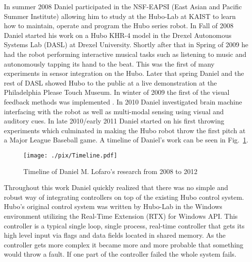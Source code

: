 In summer 2008 Daniel participated in the NSF-EAPSI (East Asian and Pacific Summer Institute) allowing him to study at the Hubo-Lab at KAIST to learn how to maintain, operate and program the Hubo series robot.
In Fall of 2008 Daniel started his work on a Hubo KHR-4 model in the Drexel Autonomous Systems Lab (DASL) at Drexel University.
Shortly after that in Spring of 2009 he had the robot performing interactive musical tasks such as listening to music and autonomously tapping its hand to the beat\cite{5686847}.
This was the first of many experiments in sensor integration on the Hubo.
Later that spring Daniel and the rest of DASL showed Hubo to the public at a live demonstration at the Philadelphia Please Touch Museum. 
In winter of 2009 the first of the visual feedback methods was implemented \cite{lofaroGamesRobot}.
In 2010 Daniel investigated brain machine interfacing with the robot as well as multi-modal sensing using visual and auditory cues\cite{lofaroIASTED2011}.
In late 2010/early 2011 Daniel started on his first throwing experiments which culminated in making the Hubo robot throw the first pitch at a Major League Baseball game\cite{lofaroHumanoids2012}.  
A timeline of Daniel's work can be seen in Fig.~\ref{fig:timeline}.

\begin{figure}[thpb]
  \centering
\texttt{[image: ./pix/Timeline.pdf]}
  \caption{Timeline of Daniel M. Lofaro's research from 2008 to 2012}
  \label{fig:timeline}
\end{figure}

Throughout this work Daniel quickly realized that there was no simple and robust way of integrating controllers on top of the existing Hubo control system.
Hubo's original control system was written by Hubo-Lab in the Windows environment utilizing the Real-Time Extension (RTX) for Windows API.
This controller is a typical single loop, single process, real-time controller that gets its high level input via flags and data fields located in shared memory.
As the controller gets more complex it became more and more probable that something would throw a fault.  
If one part of the controller failed the whole system fails.



